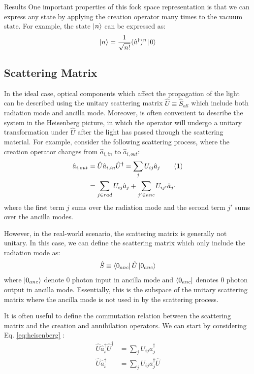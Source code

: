 \documentclass[%
 aps,
 reprint,
 twocolumn,
 amsmath,amssymb,
floatfix,
]{revtex4-2}
\newcommand\tagthis{\addtocounter{equation}{1}\tag{\theequation}}
\begin{document}
\begin{section}{Results}
One important properties of this fock space representation is that we can express any state by applying the creation operator many times to the vacuum state. For example, the state $\ket{n}$ can be expressed as:
\begin{align*}
	\ket{n} = \frac{1}{\sqrt{n!}} (\hat{a}^\dagger)^n \ket{0}
\end{align*}

\subsection{Scattering Matrix}
In the ideal case, optical components which affect the propagation of the light can be described using the unitary scattering matrix $\hat{U} \equiv \hat{S}_{all}$ which include both radiation mode and ancilla mode. Moreover, is often convenient to describe the system in the Heisenberg picture, in which the operator will undergo a unitary transformation under $\hat{U}$ after the light has passed through the scattering material. For example, consider the following scattering process, where the creation operator changes from $\hat{a}_{i, in}$ to $\hat{a}_{i, out}$:
\begin{align*}
	\hat{a}_{i, out} & = \hat{U} \hat{a}_{i, in} \hat{U}^\dagger = \sum_{j} U_{ij} \hat{a}_j \tagthis \label{eq:heisenberg} \\
	                 & = \sum_{j \in rad} U_{ij} \hat{a}_j  + \sum_{j' \in anc} U_{ij'} \hat{a}_{j'}
\end{align*}
where the first term $j$ sums over the radiation mode and the second term $j'$ sums over the ancilla modes.

However, in the real-world scenario, the scattering matrix is generally not unitary. In this case, we can define the scattering matrix which only include the radiation mode as:
\begin{align}
	\hat{S} \equiv \bra{0_{anc}} \hat{U} \ket{0_{anc}}
\end{align}
where $\ket{0_{anc}}$ denote 0 photon input in ancilla mode and $\bra{0_{anc}}$ denotes 0 photon output in ancilla mode. Essentially, this is the subspace of the unitary scattering matrix where the ancilla mode is not used in by the scattering process.

It is often useful to define the commutation relation between the scattering matrix and the creation and annihilation operators. We can start by considering Eq. \ref{eq:heisenberg} \cite{leonhardt_quantum_2003}:
\begin{align*}
	\hat{U} \hat{a}_i^\dagger \hat{U}^\dagger & = \sum_{j} U_{ij} \hat{a}_j^\dagger         \\
	\hat{U} \hat{a}_i^\dagger           & = \sum_{j} U_{ij} \hat{a}_j^\dagger \hat{U}
\end{align*}


\end{section}
\end{document}

